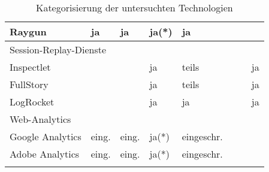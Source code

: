 \begin{longtable}{|p{4.10cm}|p{0.90cm}|p{0.90cm}|p{1.9cm}|p{1.75cm}|p{1.5cm}|p{1.4cm}|p{1.3cm}|}
\hline
Raygun & ja & ja & ja(*) & ja &  &  &  \\
\hline
\hline
\multicolumn{8}{|l|}{Session-Replay-Dienste} \\
\hline
Inspectlet &  &  & ja & teils &  &  & ja \\
\hline
FullStory &  &  & ja & teils &  &  & ja \\
\hline
LogRocket &  &  & ja & ja &  &  & ja \\
\hline
\hline
\multicolumn{8}{|l|}{Web-Analytics} \\
\hline
Google Analytics & eing. & eing. & ja(*) & eingeschr. &  &  &  \\
\hline
Adobe Analytics & eing. & eing. & ja(*) & eingeschr. &  &  &  \\
\hline
\caption{Kategorisierung der untersuchten Technologien}
\label{tab:technologie-kategorisierung}
\end{longtable}
\endgroup
